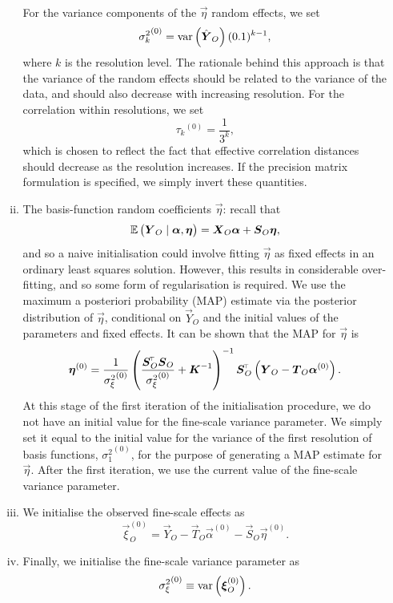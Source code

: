 \documentclass[12pt,a4paper]{article}
\begin{document}
\begin{appendices}
\begin{enumerate}
\begin{enumerate}[i.]
        For the variance components of the $\vec{\eta}$ random effects, we set
        \[
        {\sigma^2_k}^{(0)} = \var{\hat{\vec{Y}}_O} (0.1)^{k-1},
        \]
        where $k$ is the resolution level. The rationale behind this approach is that the variance of the random effects should be related to the variance of the data, and should also decrease with increasing resolution. For the correlation within resolutions, we set
        \[
        {\tau_k}^{(0)} = \frac{1}{3^{k}},
        \]
        which is chosen to reflect the fact that effective correlation distances should decrease as the resolution increases. If the precision matrix formulation is specified, we simply invert these quantities.
        \item\label{step_eta} The basis-function random coefficients $\vec{\eta}$: recall that 
        \[
        \E{\vec{Y}_O \mid \vec{\alpha}, \vec{\eta}} = \vec{X}_O\vec{\alpha} + \vec{S}_O\vec{\eta}, 
        \]
        and so a naive initialisation could involve fitting $\vec{\eta}$ as fixed effects in an ordinary least squares solution. 
        However, this results in considerable over-fitting, and so some form of regularisation is required. We use the maximum a posteriori probability (MAP) estimate via the posterior distribution of $\vec{\eta}$, conditional on $\vec{Y}_O$ and the initial values of the parameters and fixed effects.
        It can be shown that the MAP for $\vec{\eta}$ is
        \[
        \vec{\eta}^{(0)}
            =
            \frac{1}{{\sigma^2_\xi}^{(0)}}\left(\frac{\vec{S}_O^\tp\vec{S}_O}{{\sigma^2_\xi}^{(0)}} + \vec{K}^{-1}\right)^{-1}\vec{S}_O^\tp\left(\vec{Y}_O - \vec{T}_O\vec{\alpha}^{(0)}\right).
        \]
        At this stage of the first iteration of the initialisation procedure, we do not have an initial value for the fine-scale variance parameter.  We simply set it equal to the initial value for the variance of the first resolution of basis functions, ${\sigma^2_1}^{(0)}$, for the purpose of generating a MAP estimate for $\vec{\eta}$. 
        After the first iteration, we use the current value of the fine-scale variance parameter.
        \item\label{step_xi_O} We initialise the observed fine-scale effects as
        \[
        \vec{\xi}_O^{(0)} = \vec{Y}_O - \vec{T}_O \vec{\alpha}^{(0)} - \vec{S}_O \vec{\eta}^{(0)}.
        \]
        \item\label{step_sigma^2_xi} Finally, we initialise the fine-scale variance parameter as 
        \[
        {\sigma^2_\xi}^{(0)} \equiv \var{\vec{\xi}_O^{(0)}}.
        \]

\end{enumerate}
\end{enumerate}
\end{appendices}
\end{document}
